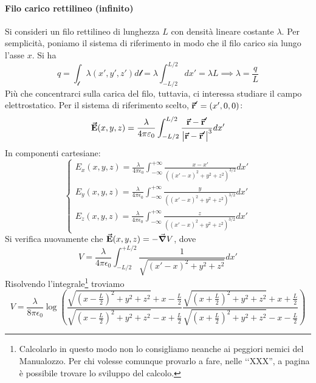 \paragraph{Filo carico rettilineo (infinito)}%
	Si consideri un filo rettilineo di lunghezza $L$ con densità lineare costante $\lambda$. Per semplicità, poniamo il sistema di riferimento in modo che il filo carico sia lungo l'asse $x$. Si ha
	\begin{equation*}
		q=\int_{\mathcal{l}}\lambda(x',y',z')d\mathcal{l}=\lambda\int_{-L/2}^{L/2}dx'=\lambda L\implies \lambda=\frac{q}{L}
	\end{equation*}
	 Più che concentrarci sulla carica del filo, tuttavia, ci interessa studiare il campo elettrostatico. Per il sistema di riferimento scelto, $\vb*{\va{r}}'=\left(x',0,0\right)$:
	\begin{equation}
		\vb*{\va{E}}(x,y,z)=\frac{\lambda}{4\pi\varepsilon_0}\int_{-L/2}^{L/2}\frac{\vb*{\va{r}}-\vb*{\va{r}}'}{\abs{\vb*{\va{r}}-\vb*{\va{r}}'}^3}dx'
	\end{equation}
	In componenti cartesiane:
	\begin{equation*}
		\begin{cases}
			E_x(x,y,z)=\frac{\lambda}{4\pi\epsilon_0}\int_{-\infty}^{+\infty}\frac{x-x'}{\left((x'-x)^2+y^2+z^2\right)^{3/2}}dx'\\
			E_y(x,y,z)=\frac{\lambda}{4\pi\epsilon_0}\int_{-\infty}^{+\infty}\frac{y}{\left((x'-x)^2+y^2+z^2\right)^{3/2}}dx'\\
			E_z(x,y,z)=\frac{\lambda}{4\pi\epsilon_0}\int_{-\infty}^{+\infty}\frac{z}{\left((x'-x)^2+y^2+z^2\right)^{3/2}}dx'
		\end{cases}
	\end{equation*}
	Si verifica nuovamente che $\vb*{\va{E}}(x,y,z)=-\grad{V}$, dove
	\begin{equation}
		V=\frac{\lambda}{4\pi\epsilon_0}\int_{-L/2}^{+L/2}\frac{1}{\sqrt{(x'-x)^2+y^2+z^2}}dx'
	\end{equation}
	Risolvendo l'integrale\footnote{Calcolarlo in questo modo non lo consigliamo neanche ai peggiori nemici del Manualozzo\texttrademark. Per chi volesse comunque provarlo a fare, nelle ‘‘XXX'', a pagina \pageref{XXX} è possibile trovare lo sviluppo del calcolo.} troviamo
	\begin{equation}
		V=\frac{\lambda}{8\pi\epsilon_0}\log\left(\frac{\sqrt{\left(x-\frac{L}{2}\right)^2+y^2+z^2}+x-\frac{L}{2}}{\sqrt{\left(x-\frac{L}{2}\right)^2+y^2+z^2}-x+\frac{L}{2}}\frac{\sqrt{\left(x+\frac{L}{2}\right)^2+y^2+z^2}+x+\frac{L}{2}}{\sqrt{\left(x+\frac{L}{2}\right)^2+y^2+z^2}-x-\frac{L}{2}}\right)
	\end{equation}
